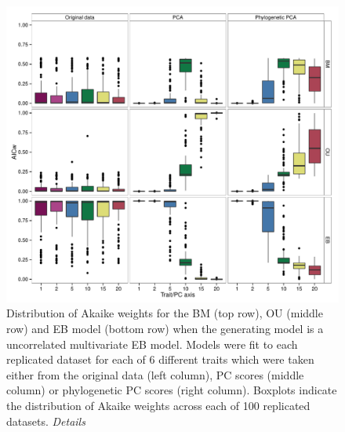 \documentclass[a4paper,12pt]{article}
\begin{document}
\begin{figure}[p]
\centering
\includegraphics[scale=0.65]{./fig/box-aicw-mveb.pdf}
\caption{Distribution of Akaike weights for the BM (top row), OU (middle row) and EB model (bottom row) when the generating model is a uncorrelated multivariate EB model. Models were fit to each replicated dataset for each of 6 different traits which were taken either from the original data (left column), PC scores (middle column) or phylogenetic PC scores (right column). Boxplots indicate the distribution of Akaike weights across each of 100 replicated datasets. \emph{Details}}
\label{aicweb}
\end{figure}
\end{document}
